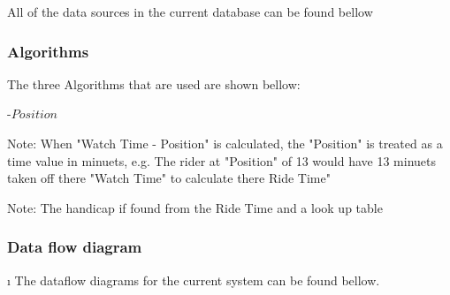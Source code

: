 All of the data sources in the current database can be found bellow




\subsubsection{Algorithms}
The three Algorithms that are used are shown bellow:

\begin{algorithm}[H]
\label{fig:Ride Time Algorithm}
	\caption{$Ride Time Algorithum$}
\begin{algorithmic}[1]
-{$Position$}
\end{algorithmic}
\end{algorithm}

Note: When "Watch Time - Position" is calculated, the "Position" is treated as a time value in minuets, e.g. The rider at "Position" of 13 would have 13 minuets taken off there "Watch Time" to calculate there Ride Time"

\begin{algorithm}[H]
\label{fig:Time Sort Algorithm}
	\caption{$Time Sort Algorithm$}
\begin{algorithmic}[2]
		\EndIf
	\EndFor
\EndWhile
\end{algorithmic}
\end{algorithm}

\begin{algorithm}[H]
\label{fig:Handicap Time Algorithm}
	\caption{$Handicap Time Algorithm$}
\begin{algorithmic}[3]
\end{algorithmic}
\end{algorithm}

Note: The handicap if found from the Ride Time and a look up table
\subsubsection{Data flow diagram}\i
The dataflow diagrams for the current system can be found bellow.





